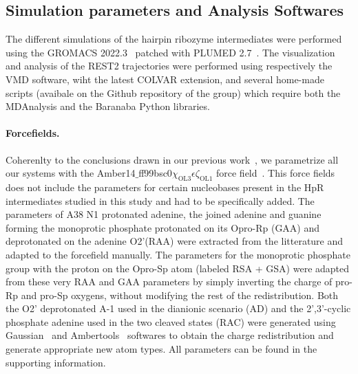 \documentclass[journal=jacsat,manuscript=article]{achemso}
\begin{document}
\subsection{Simulation parameters and Analysis Softwares}

The different simulations of the hairpin ribozyme intermediates were performed 
using the GROMACS 2022.3~\cite{abraham_gromacs_2015} patched with PLUMED 2.7~\cite{tribello_plumed_2014, the_plumed_consortium_promoting_2019}.
The visualization and analysis of the REST2 trajectories were performed 
using respectively the VMD software, wiht the latest COLVAR extension,
and several home-made scripts (avaibale on the Github repository of the group) which require both the MDAnalysis and the Baranaba Python libraries.


\paragraph{Forcefields.}
Coherenlty to the conclusions drawn in our previous work~\cite{forget2024simulation}, 
we parametrize all our systems with the Amber14$\_$ff99bsc0\-$\chi_\mathrm{OL3}\epsilon \zeta_\mathrm{OL1}$ force field~\cite{zgarbova_toward_2013}.
This force fields does not include the parameters for certain nucleobases present in the HpR intermediates studied in this study 
and had to be specifically added. 
The parameters of A38 N1 protonated adenine, the joined adenine and guanine forming the monoprotic phosphate protonated on its Opro-Rp (GAA) 
and deprotonated on the adenine O2'(RAA) were extracted from the litterature\cite{forget2024simulation} and adapted to the forcefield manually.
The parameters for the monoprotic phosphate group with the proton on the Opro-Sp atom (labeled RSA + GSA) were adapted from these very RAA and GAA parameters by simply inverting the charge of pro-Rp and pro-Sp oxygens, without modifying the rest of the redistribution.
Both the O2' deprotonated A-1 used in the dianionic scenario (AD) 
and the 2',3'-cyclic phosphate adenine used in the two cleaved states (RAC)
were generated using Gaussian~\cite{g16} and Ambertools~\cite{case_ambertools_2023} softwares
to obtain the charge redistribution and generate appropriate new atom types. All parameters can be found in the supporting information.
\end{document}
